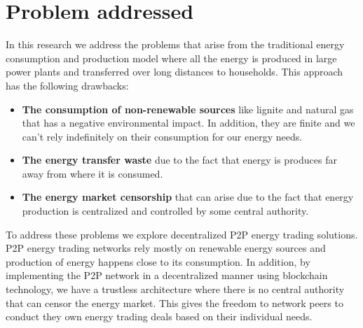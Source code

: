 \section{Problem addressed}
\label{problems}
In this research we address the problems that arise from the traditional energy consumption and production model where all the energy is produced in large power plants and transferred over long
distances to households. This approach has the following drawbacks:
\begin{itemize}
    \item \textbf{The consumption of non-renewable sources} like lignite and natural gas that has a negative environmental impact. In addition, they are finite and we can't rely indefinitely on their consumption
    for our energy needs.
    \item \textbf{The energy transfer waste} due to the fact that energy is produces far away from where it is consumed.
    \item \textbf{The energy market censorship} that can arise due to the fact that energy production is centralized and controlled by some central authority.
\end{itemize}
To address these problems we explore decentralized P2P energy trading solutions. P2P energy trading networks rely mostly on renewable energy sources and production of energy happens close to its consumption. In addition, by implementing
the P2P network in a decentralized manner using blockchain technology, we have a trustless architecture where there is no central authority that can censor the energy market. This gives the freedom to network peers to conduct they own
energy trading deals based on their individual needs.

